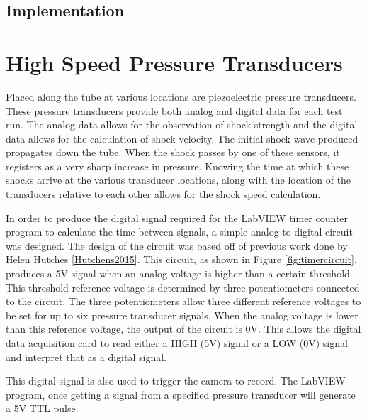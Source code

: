 \subsection{Implementation}





\section{High Speed Pressure Transducers}

Placed along the tube at various locations are piezoelectric pressure transducers. These pressure transducers provide both analog and digital data for each test run. The analog data allows for the observation of shock strength and the digital data allows for the calculation of shock velocity. The initial shock wave produced propagates down the tube. When the shock passes by one of these sensors, it registers as a very sharp increase in pressure. Knowing the time at which these shocks arrive at the various transducer locations, along with the location of the transducers relative to each other allows for the shock speed calculation. 

In order to produce the digital signal required for the LabVIEW timer counter program to calculate the time between signals, a simple analog to digital circuit was designed. The design of the circuit was based off of previous work done by Helen Hutches \ref{Hutchens2015}. This circuit, as shown in Figure \ref{fig:timercircuit}, produces a 5V signal when an analog voltage is higher than a certain threshold. This threshold reference voltage is determined by three potentiometers connected to the circuit. The three potentiometers allow three different reference voltages to be set for up to six pressure transducer signals. When the analog voltage is lower than this reference voltage, the output of the circuit is 0V. This allows the digital data acquisition card to read either a HIGH (5V) signal or a LOW (0V) signal and interpret that as a digital signal. 

This digital signal is also used to trigger the camera to record. The LabVIEW program, once getting a signal from a specified pressure transducer will generate a 5V TTL pulse. 

